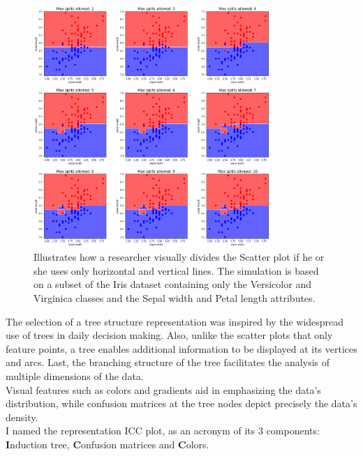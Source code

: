 \documentclass[11pt]{article}
\begin{document}
\begin{figure}[H]
\centering
\includegraphics[width=0.8\textwidth]{scatter_plot_illustration.png}

\caption{Illustrates how a researcher visually divides the Scatter plot if he or she uses only horizontal and vertical lines. The simulation is based on a subset of the Iris dataset containing only the Versicolor and Virginica classes and the Sepal width and Petal length attributes.}
\label{fig:fig1}

\end{figure}

The selection of a tree structure representation was inspired by the widespread use of trees in daily decision making. Also, unlike the scatter plots that only feature points, a tree enables additional information to be displayed at its vertices and arcs. Last, the branching structure of the tree facilitates the analysis of multiple dimensions of the data. \\
Visual features such as colors and gradients aid in emphasizing the data's distribution, while confusion matrices at the tree nodes depict precisely the data's density. \\
I named the representation ICC plot, as an acronym of its 3 components: \textbf{I}nduction tree, \textbf{C}onfusion matrices and \textbf{C}olors.
\end{document}
